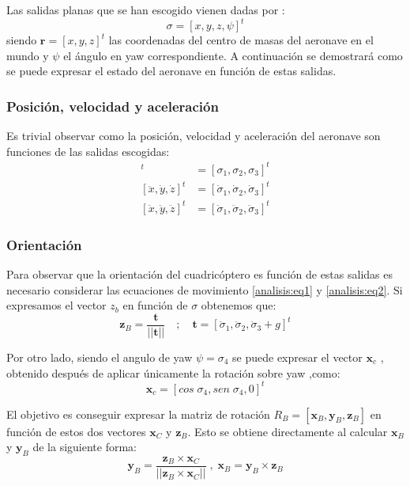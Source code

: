 Las salidas planas que se han escogido vienen dadas por :
\begin{equation}
	\sigma = [x,y,z,\psi]^t
\end{equation}
siendo $\mathbf{r}= [x,y,z]^t$ las coordenadas del centro de masas del aeronave en el mundo y $\psi$ el ángulo en yaw correspondiente. A continuación se demostrará como se puede expresar el estado del aeronave en función de estas salidas.

\subsubsection{Posición, velocidad y aceleración}

Es trivial observar como la posición, velocidad y aceleración del aeronave son funciones de las salidas escogidas:
\begin{align}
[x,y,z]^t &= [\sigma_1,\sigma_2,\sigma_3]^t\\
[\ddot x,\dot y,\dot z]^t &= [\dot \sigma_1,\dot \sigma_2,\dot \sigma_3]^t\\
[\ddot x,\ddot y,\ddot z]^t &= [\ddot \sigma_1,\ddot \sigma_2,\ddot \sigma_3]^t
\end{align}


\subsubsection{Orientación}
Para observar que la orientación del cuadricóptero es función de estas salidas es necesario considerar las ecuaciones de movimiento \ref{analisis:eq1} y \ref{analisis:eq2}. Si expresamos el vector $z_b$ en función de $\sigma$ obtenemos que:
\begin{equation}
	\mathbf{z}_B = \frac{\mathbf{t}}{||\mathbf{t}||} \quad;\quad \mathbf{t} = [\ddot\sigma_1,\ddot\sigma_2,\ddot\sigma_3 + g]^t
\end{equation}

Por otro lado, siendo el angulo de yaw $\psi = \sigma_4$ se puede expresar el vector $\mathbf{x}_c$ , obtenido después de aplicar únicamente la rotación sobre yaw ,como:
\begin{equation}
	\mathbf{x}_c = [cos\;\sigma_4,sen\;\sigma_4,0]^t
\end{equation}

El objetivo es conseguir expresar la matriz de rotación $R_B = [\mathbf{x}_B,\mathbf{y}_B,\mathbf{z}_B]$ en función de estos dos vectores $\mathbf{x}_C$ y $\mathbf{z}_B$. Esto se obtiene directamente al calcular $\mathbf{x}_B$ y $\mathbf{y}_B$ de la siguiente forma:
\begin{equation}
	\mathbf{y}_{B} = \frac{\mathbf{z}_{B}\times\mathbf{x}_{C}}{||\mathbf{z}_{B}\times\mathbf{x}_{C}||}\;,\; \mathbf{x}_{B} = \mathbf{y}_{B} \times\mathbf{z}_{B}
\end{equation}

